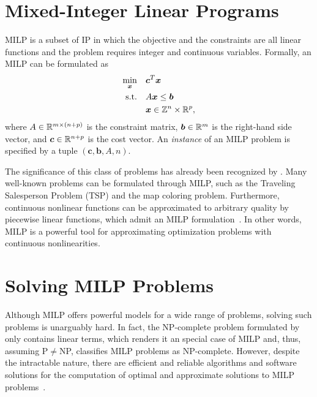 \section{Mixed-Integer Linear Programs}

MILP is a subset of IP in which the objective and the constraints are all linear functions and the problem requires integer and continuous variables.
Formally, an MILP can be formulated as 
\begin{equation}\label{eq:general-milp}
\begin{split}
    \min_{\bm{x}} \quad & \bm{c}^{T}\bm{x} \\
    \textrm{s.t.} \quad & A\bm{x} \le \bm{b} \\
	  & \bm{x} \in \mathbb{Z}^{n}\times \mathbb{R}^{p}
,\end{split}
\end{equation}
where $A\in \mathbb{R}^{m\times (n+p)}$ is the constraint matrix, $\bm{b}\in \mathbb{R}^{m}$ is the right-hand side vector, and $\bm{c}\in \mathbb{R}^{n+p}$ is the cost vector.
An \emph{instance} of an MILP problem is specified by a tuple  $\left( \bm{c},\bm{b},A,n \right)$.

The significance of this class of problems has already been recognized by .
Many well-known problems can be formulated through MILP, such as the Traveling Salesperson Problem (TSP) and the map coloring problem.
Furthermore, continuous nonlinear functions can be approximated to arbitrary quality by piecewise linear functions, which admit an MILP formulation~\cite{camponogaraModelsAlgorithmsOptimal2015}.
In other words, MILP is a powerful tool for approximating optimization problems with continuous nonlinearities.

\section{Solving MILP Problems}

Although MILP offers powerful models for a wide range of problems, solving such problems is unarguably hard.
In fact, the NP-complete problem formulated by  only contains linear terms, which renders it an special case of MILP and, thus, assuming P$\neq$NP, classifies MILP problems as NP-complete.
However, despite the intractable nature, there are efficient and reliable algorithms and software solutions for the computation of optimal and approximate solutions to MILP problems~\cite{bengioMachineLearningCombinatorial2021}.

